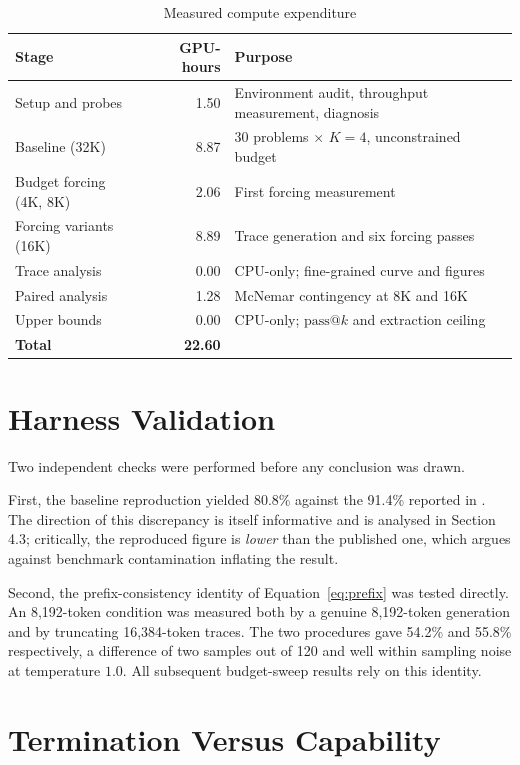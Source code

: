 \documentclass[12pt,a4paper,oneside]{report}
\begin{document}
\begin{table}[htbp]
\centering
\caption{Measured compute expenditure}
\label{tab:compute}
\small
\begin{tabular}{@{}lrl@{}}
\toprule
\textbf{Stage} & \textbf{GPU-hours} & \textbf{Purpose} \\
\midrule
Setup and probes & 1.50 & Environment audit, throughput measurement, diagnosis \\
Baseline (32K) & 8.87 & 30 problems $\times$ $K{=}4$, unconstrained budget \\
Budget forcing (4K, 8K) & 2.06 & First forcing measurement \\
Forcing variants (16K) & 8.89 & Trace generation and six forcing passes \\
Trace analysis & 0.00 & CPU-only; fine-grained curve and figures \\
Paired analysis & 1.28 & McNemar contingency at 8K and 16K \\
Upper bounds & 0.00 & CPU-only; $\text{pass}@k$ and extraction ceiling \\
\midrule
\textbf{Total} & \textbf{22.60} & \\
\bottomrule
\end{tabular}
\end{table}

\section{Harness Validation}

Two independent checks were performed before any conclusion was drawn.

First, the baseline reproduction yielded 80.8\% against the 91.4\% reported in
\cite{vibethinker}. The direction of this discrepancy is itself informative and
is analysed in Section 4.3; critically, the reproduced figure is \emph{lower}
than the published one, which argues against benchmark contamination inflating
the result.

Second, the prefix-consistency identity of Equation~\eqref{eq:prefix} was
tested directly. An 8{,}192-token condition was measured both by a genuine
8{,}192-token generation and by truncating 16{,}384-token traces. The two
procedures gave 54.2\% and 55.8\% respectively, a difference of two samples out
of 120 and well within sampling noise at temperature $1.0$. All subsequent
budget-sweep results rely on this identity.

\section{Termination Versus Capability}
\end{document}

